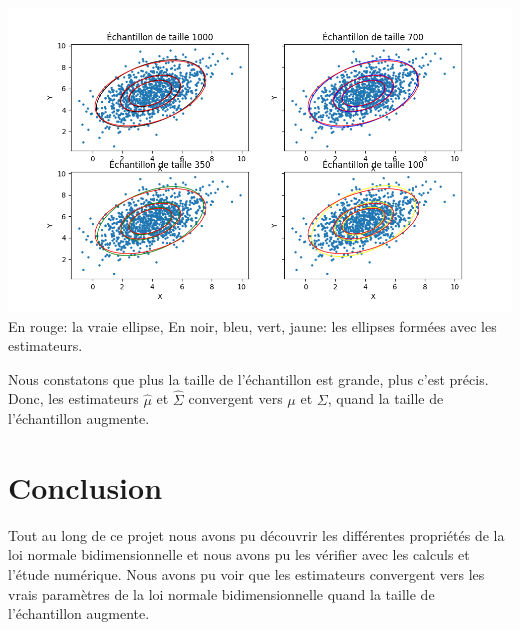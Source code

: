\documentclass{article}
\begin{document}
\includegraphics[width=\textwidth]{Figure_2.png}
En rouge: la vraie ellipse, En noir, bleu, vert, jaune: les ellipses formées avec les estimateurs.

Nous constatons que plus la taille de l'échantillon est grande, plus c'est précis. Donc, les estimateurs $\hat{\mu}$ et $\hat{\Sigma}$ convergent vers $\mu$ et $\Sigma$, quand la taille de l'échantillon augmente.

\section{Conclusion}
Tout au long de ce projet nous avons pu découvrir les différentes propriétés de la loi normale bidimensionnelle et nous avons pu les vérifier avec les calculs et l'étude numérique.
Nous avons pu voir que les estimateurs convergent vers les vrais paramètres de la loi normale bidimensionnelle quand la taille de l'échantillon augmente.
\end{document}
